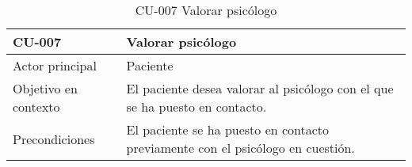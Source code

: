 %
%

\begin{table}[htpb]
\centering
\caption{CU-007 Valorar psicólogo}
\begin{tabularx}{\textwidth}{|X|X|}
\hline
CU-007                            & Valorar psicólogo                                                                                                                                                                                                                                                                                                                                                                                                                                                                                                                                                                                                                                                                  \\ \hline
Actor principal                   & Paciente                                                                                                                                                                                                                                                                                                                                                                                                                                                                                                                                                                                                                                                                           \\ \hline
Objetivo en contexto              & El paciente desea  valorar al psicólogo con el que se ha puesto en contacto.                                                                                                                                                                                                                                                                                                                                                                                                                                                                                                                                                                                                       \\ \hline
Precondiciones                    & El paciente se ha puesto en contacto previamente con el psicólogo en cuestión.                                                                                                                                                                                                                                                                                                                                                                                                                                                                                                                                                                                                     \\ \hline

\end{tabularx}
\end{table}
